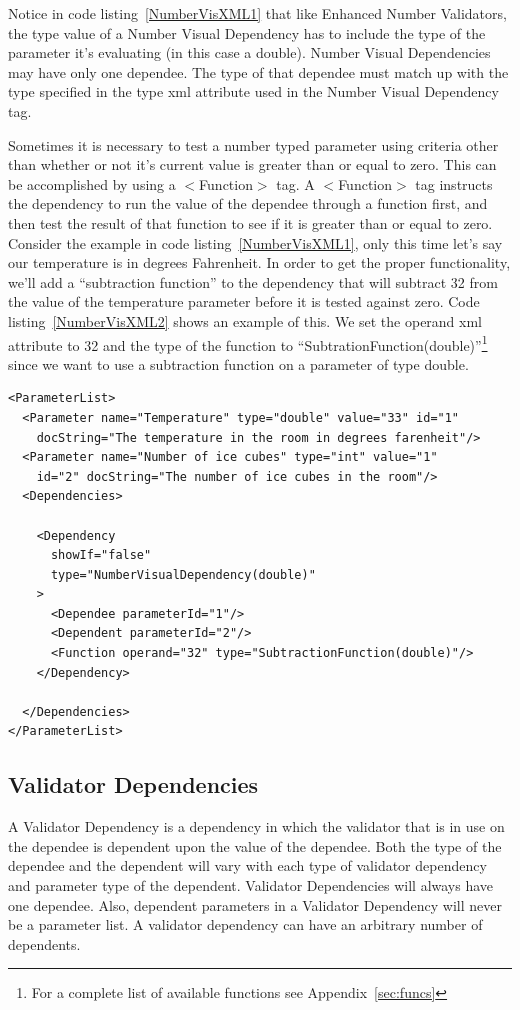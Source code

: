 Notice in code listing~\ref{NumberVisXML1} that like Enhanced Number Validators, the type value of a Number Visual Dependency has to include the type of the
parameter it's evaluating (in this case a double). Number Visual Dependencies may have only one dependee. The type of that dependee must match up with the
type specified in the type xml attribute used in the Number Visual Dependency tag.

Sometimes it is necessary to test a number typed parameter using criteria other than whether or not it's current value is greater than or equal to zero.
This can be accomplished by using a $<$Function$>$ tag. A $<$Function$>$ tag instructs the dependency to run the value of the dependee through a function
first, and then test the result of that function to see if it is greater than or equal to zero. Consider the example in code listing~\ref{NumberVisXML1}, only this
time let's say our temperature is in degrees Fahrenheit. In order to get the proper functionality, we'll add a ``subtraction function'' to the dependency that will
subtract 32 from the value of the temperature parameter before it is tested against zero. Code listing~\ref{NumberVisXML2} shows an example of this. We set the operand 
xml attribute to 32 and the type of the function to ``SubtrationFunction(double)''\footnote{For a complete list of available functions see Appendix~\ref{sec:funcs}}
 since we want to use a subtraction function on a parameter of type double.
\begin{lstlisting}[caption={Example usage of a Number Visual Dependency using a function}, label=NumberVisXML2]
<ParameterList>
  <Parameter name="Temperature" type="double" value="33" id="1" 
    docString="The temperature in the room in degrees farenheit"/>
  <Parameter name="Number of ice cubes" type="int" value="1"
    id="2" docString="The number of ice cubes in the room"/>
  <Dependencies>

    <Dependency 
      showIf="false" 
      type="NumberVisualDependency(double)"
    >
      <Dependee parameterId="1"/>
      <Dependent parameterId="2"/>
      <Function operand="32" type="SubtractionFunction(double)"/> 
    </Dependency>

  </Dependencies>
</ParameterList>
\end{lstlisting}

\subsection{Validator Dependencies}
A Validator Dependency is a dependency in which the validator that is in use on the dependee is dependent upon the value of the dependee. Both the type of
the dependee and the dependent will vary with each type of validator dependency and parameter type of the dependent. Validator Dependencies will always have
one dependee. Also, dependent parameters in a Validator Dependency will never be a parameter list. A validator dependency can have an arbitrary number of 
dependents.

